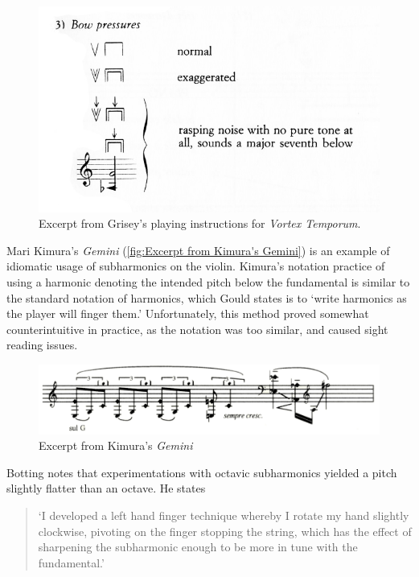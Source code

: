 \begin{figure}
  \includegraphics[width=\linewidth]{./resources/griseyVortexTemporum.jpg}
  \caption{Excerpt from Grisey's playing instructions for \emph{Vortex Temporum}.}
\label{fig:Excerpt from Grisey's playing instructions for Vortex Temporum}
\end{figure}


Mari Kimura's \emph{Gemini} (\autoref{fig:Excerpt from Kimura's Gemini}) is an example of idiomatic usage of subharmonics on the violin.\autocite[]{kimuraGemini1992}
Kimura's notation practice of using a harmonic denoting the intended pitch below the fundamental is similar to the standard notation of harmonics, which Gould states is to `write harmonics as the player will finger them.'\autocite[413]{gouldBars2011} 
Unfortunately, this method proved somewhat counterintuitive in practice, as the notation was too similar, and caused sight reading issues.

  
\begin{figure}
  \includegraphics[width=\linewidth]{./resources/kimura_gemini.png}
  \caption{Excerpt from Kimura's \emph{Gemini}}\label{fig:Excerpt from Kimura's Gemini}
\end{figure}

  Botting notes that experimentations with octavic subharmonics yielded a pitch slightly flatter than an octave. He states \begin{quotation}
    `I developed a left hand finger technique whereby I rotate my hand slightly clockwise, pivoting on the finger stopping the string, which has the effect of sharpening the subharmonic enough to be more in tune with the fundamental.'\autocite[111]{bottingDevelopingPersonalVocabulary2019}
\end{quotation}

